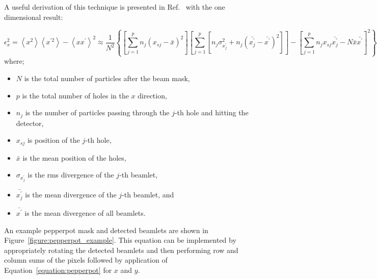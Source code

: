 A useful derivation of this technique is presented in Ref.~\cite{zhang_emittance_1996} with the one dimensional result:

\begin{dmath}\label{equation:pepperpot}
\epsilon_x^2 = \left\langle x^2\right\rangle \left\langle x^{\prime2}\right\rangle - \left\langle xx^\prime\right\rangle^2\allowbreak
\approx \frac{1}{N^2} \left\{\left[\sum_{j=1}^p{n_j\left(x_{sj}-\bar{x}\right)^2}\right] \left[ \sum_{j=1}^p{\left[n_j\sigma_{x_j^\prime}^2 + n_j\left(\bar{x_j^\prime}-\bar{x^\prime}\right)^2\right]}\right] - \left[ \sum_{j=1}^p{n_jx_{sj}\bar{x_j^\prime}-N\bar{x}\bar{x^\prime}}\right]^2\right\}
\end{dmath}
where;
\begin{itemize}
    \item $N$ is the total number of particles after the beam mask,
    \item $p$ is the total number of holes in the $x$ direction,
    \item $n_j$ is the number of particles passing through the $j$-th hole and hitting the detector,
    \item $x_{sj}$ is position of the $j$-th hole,
    \item $\bar{x}$ is the mean position of the holes,
    \item $\sigma_{x_j^\prime}$ is the \gls{rms} divergence of the $j$-th beamlet,
    \item $\bar{x_j^\prime}$ is the mean divergence of the $j$-th beamlet, and
    \item $\bar{x^\prime}$ is the mean divergence of all beamlets.
\end{itemize}

An example pepperpot mask and detected beamlets are shown in Figure~\ref{figure:pepperpot_example}.
This equation can be implemented by appropriately rotating the detected beamlets and then performing row and column sums of the pixels followed by application of Equation~\ref{equation:pepperpot} for $x$ and $y$.

